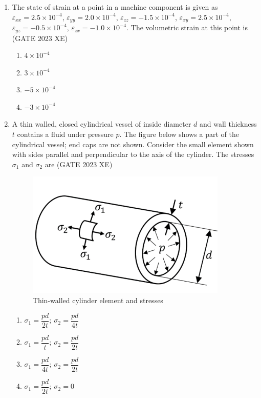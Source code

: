 \documentclass[journal,12pt,onecolumn]{IEEEtran}
\begin{document}
\begin{enumerate}
\item The state of strain at a point in a machine component is given as
$\varepsilon_{xx}=2.5\times 10^{-4}$, $\varepsilon_{yy}=2.0\times 10^{-4}$, $\varepsilon_{zz}=-1.5\times 10^{-4}$,
$\varepsilon_{xy}=2.5\times 10^{-4}$, $\varepsilon_{yz}=-0.5\times 10^{-4}$, $\varepsilon_{zx}=-1.0\times 10^{-4}$.
The volumetric strain at this point is\\
\hfill{(GATE 2023 XE)}

\begin{multicols}{2}
\begin{enumerate}
\item $4\times 10^{-4}$
\item $3\times 10^{-4}$
\item $-5\times 10^{-4}$
\item $-3\times 10^{-4}$
\end{enumerate}
\end{multicols}

\item A thin walled, closed cylindrical vessel of inside diameter $d$ and wall thickness $t$
contains a fluid under pressure $p$. The figure below shows a part of the cylindrical
vessel; end caps are not shown. Consider the small element shown with sides
parallel and perpendicular to the axis of the cylinder. The stresses $\sigma_1$ and $\sigma_2$ are
\hfill{(GATE 2023 XE)}

\begin{figure}[htbp]
\centering
\includegraphics[width=0.4\columnwidth]{figs/C/fig4.png}
\caption{Thin-walled cylinder element and stresses}
\label{fig:figs/C/fig4.png}
\end{figure}

\begin{multicols}{2}
\begin{enumerate}
\item $\sigma_1=\dfrac{pd}{2t};\ \sigma_2=\dfrac{pd}{4t}$
\item $\sigma_1=\dfrac{pd}{t};\ \sigma_2=\dfrac{pd}{2t}$
\item $\sigma_1=\dfrac{pd}{4t};\ \sigma_2=\dfrac{pd}{2t}$
\item $\sigma_1=\dfrac{pd}{2t};\ \sigma_2=0$
\end{enumerate}
\end{multicols}


\end{enumerate}
\end{document}
